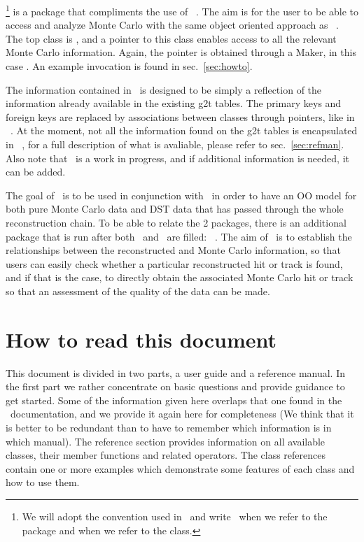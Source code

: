 \StMcEvent\footnote{We will adopt the convention used in \StEvent\ 
    and write \StMcEvent\ when we refer to the package and
     when we refer to the class.} is a package that
compliments the use of \StEvent\ . The aim is for the user to be able
to access and analyze Monte Carlo with the same object oriented
approach as \StEvent\ . The top class is , and a
pointer to this  class enables access to all the relevant Monte Carlo
information.  Again, the pointer is obtained through a Maker, in this
case \name{StMcEventMaker}.  An example invocation is found in sec.~\ref{sec:howto}.

The information contained in \StMcEvent\ is designed to be simply
a reflection of the information already available in the existing
g2t tables.  The primary keys and foreign keys are replaced by
associations between classes through pointers, like in \StEvent\ .
At the moment, not all the information found on the g2t tables is
encapsulated in \StMcEvent\ , for a full description of what is
avaliable, please refer to sec.~\ref{sec:refman}.  Also note that
\StMcEvent\ is a work in progress, and if additional information
is needed, it can be added.

The goal of \StMcEvent\ is to be used in conjunction with \StEvent\ in
order to have an OO model for both pure Monte Carlo data and DST data
that has passed through the whole reconstruction chain.  To be able
to relate the 2 packages, there is an additional package that is
run after both \StEvent\ and \StMcEvent\ are filled: \StAssociationMaker\ .
\index{StAssociationMaker}
The aim of \StAssociationMaker\ is to establish the relationships
between the reconstructed and Monte Carlo information, so that
users can easily check whether a particular reconstructed hit or
track is found, and if that is the case,
to directly obtain the associated Monte
Carlo hit or track so that an assessment of the quality of the
data can be made.

\clearpage


\section{How to read this document}

This document is divided in two parts, a user guide and a
reference manual. In the first part we rather concentrate on basic
questions and provide guidance to get started.  Some of the information
given here overlaps that one found in the \StEvent\ documentation,
and we provide it again here for completeness (We think that it is better
to be redundant than to have to remember which information is in which
manual).  The reference section
provides information on all available classes, their member functions
and related operators. The class references contain one or more
examples which demonstrate some features of each class and how to use
them.

